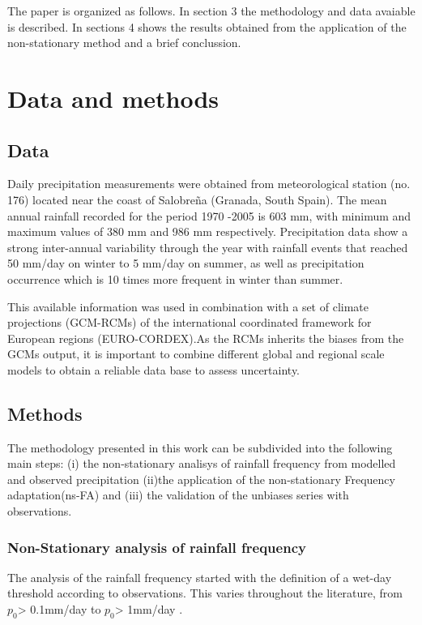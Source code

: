\documentclass[a4paper,11pt]{article}
\begin{document}
The paper is organized as follows. In section 3 the methodology and data avaiable is described. In sections 4 shows the results obtained from the application of the non-stationary method and a brief conclussion.  


\section{Data and methods}\label{sec2}
\subsection{Data} 
Daily precipitation measurements were obtained from meteorological station (no. 176) located near the coast of Salobreña (Granada, South Spain). The mean annual rainfall recorded for the period 1970 -2005 is 603 mm, with minimum and maximum values of 380 mm and 986 mm respectively. Precipitation data show a strong inter-annual variability through the year with rainfall events that reached 50 mm/day on winter to 5 mm/day on summer, as well as precipitation occurrence which is 10 times more frequent in winter than summer.

This available information was used in combination with a set of climate projections (GCM-RCMs) of the international coordinated framework for European regions (EURO-CORDEX).As the RCMs inherits the biases from the GCMs output, it is important to combine different global and regional scale models to obtain a reliable data base to assess uncertainty.  


\subsection{Methods} 
The methodology presented in this work can be subdivided into the following main steps: (i) the non-stationary analisys of rainfall frequency from modelled and observed precipitation (ii)the application of the non-stationary Frequency adaptation(ns-FA) and (iii) the validation of the unbiases series with observations.

\subsubsection{Non-Stationary analysis of rainfall frequency} 
The analysis of the rainfall frequency started with the definition of a wet-day threshold according to observations. This varies throughout the literature, from $p_{0}$> 0.1mm/day \cite{bib7} to $p_{0}$> 1mm/day \cite{bib8}. 
\end{document}
